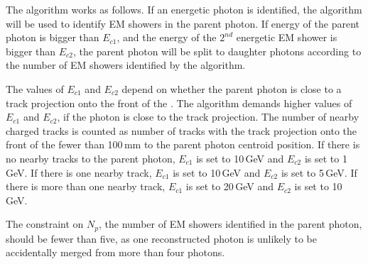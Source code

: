 The algorithm works as follows. If an energetic photon is identified, the \peakFinding algorithm will  be used to identify EM showers in the parent photon. If energy of the parent photon is bigger than $E_{c1}$, and the energy of the $2^{nd}$ energetic EM shower is bigger than $E_{c2}$, the parent photon will be split to daughter photons according to the number of EM showers identified by the \peakFinding algorithm.

The values of $E_{c1}$ and $E_{c2}$ depend on whether the parent photon is close to a track projection onto the front of the \ECAL. The algorithm demands  higher values of $E_{c1}$ and   $E_{c2}$, if the photon is close to the track projection. The number of nearby charged tracks is counted as number of tracks with the track projection onto the front of the \ECAL fewer than 100\,mm to the parent photon centroid position. If there is no nearby tracks to the parent photon, $E_{c1}$ is set to 10\,GeV and $E_{c2}$ is set to 1\,GeV. If there is one nearby track, $E_{c1}$ is set to 10\,GeV and $E_{c2}$ is set to 5\,GeV. If there is more than one nearby track, $E_{c1}$ is set to 20\,GeV and $E_{c2}$ is set to 10\,GeV.



The constraint on $N_{p}$, the number of EM showers identified in the parent photon, should be fewer than five, as one reconstructed photon is unlikely to be accidentally merged from more than four photons.


